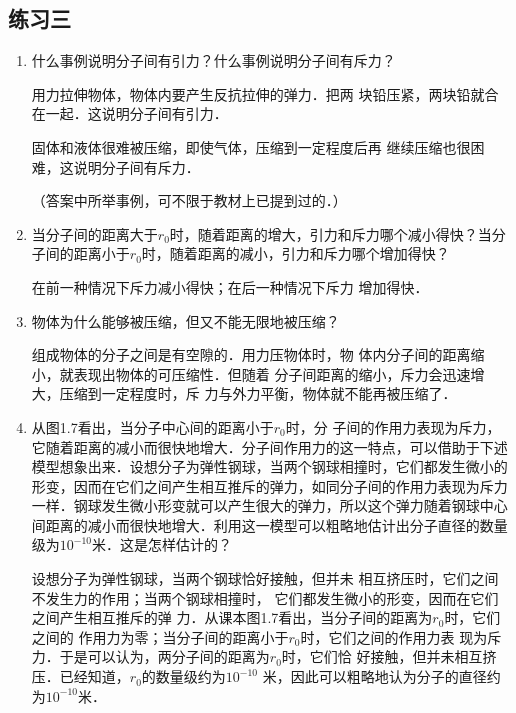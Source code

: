 \subsection{练习三}
\begin{enumerate}
	\item 什么事例说明分子间有引力？什么事例说明分子间有斥力？
	
\begin{solution}
    用力拉伸物体，物体内要产生反抗拉伸的弹力．把两
    块铅压紧，两块铅就合在一起．这说明分子间有引力．

    固体和液体很难被压缩，即使气体，压缩到一定程度后再
    继续压缩也很困难，这说明分子间有斥力．

    （答案中所举事例，可不限于教材上已提到过的．）
\end{solution}
	\item 当分子间的距离大于$r_0$时，随着距离的增大，引力和斥力哪个减小得快？当分子间的距离小于$r_0$时，随着距离的减小，引力和斥力哪个增加得快？
		
\begin{solution}
在前一种情况下斥力减小得快；在后一种情况下斥力
增加得快．
\end{solution}
	\item 物体为什么能够被压缩，但又不能无限地被压缩？
		
\begin{solution}
    组成物体的分子之间是有空隙的．用力压物体时，物
    体内分子间的距离缩小，就表现出物体的可压缩性．但随着
    分子间距离的缩小，斥力会迅速增大，压缩到一定程度时，斥
    力与外力平衡，物体就不能再被压缩了．
\end{solution}
\item	从图1.7看出，当分子中心间的距离小于$r_0$时，分
子间的作用力表现为斥力，它随着距离的减小而很快地增大．分子间作用力的这一特点，可以借助于下述模型想象出来．设想分子为弹性钢球，当两个钢球相撞时，它们都发生微小的形变，因而在它们之间产生相互推斥的弹力，如同分子间的作用力表现为斥力一样．钢球发生微小形变就可以产生很大的弹力，所以这个弹力随着钢球中心间距离的减小而很快地增大．利用这一模型可以粗略地估计出分子直径的数量级为$10^{-10}$米．这是怎样估计的？
	
\begin{solution}
    设想分子为弹性钢球，当两个钢球恰好接触，但并未
    相互挤压时，它们之间不发生力的作用；当两个钢球相撞时，
    它们都发生微小的形变，因而在它们之间产生相互推斥的弹
    力．从课本图1.7看出，当分子间的距离为$r_0$时，它们之间的
    作用力为零；当分子间的距离小于$r_0$时，它们之间的作用力表
    现为斥力．于是可以认为，两分子间的距离为$r_0$时，它们恰
    好接触，但并未相互挤压．已经知道，$r_0$的数量级约为$10^{-10}$
    米，因此可以粗略地认为分子的直径约为$10^{-10}$米．
\end{solution}
\end{enumerate}

